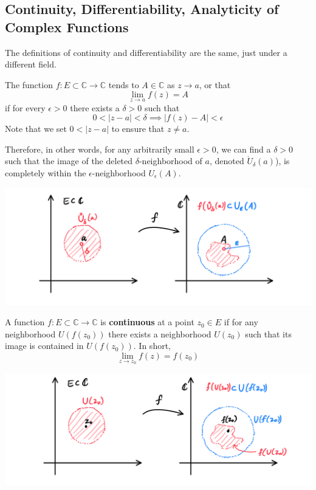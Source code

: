     \subsection{Continuity, Differentiability, Analyticity of Complex Functions}

    The definitions of continuity and differentiability are the same, just under a different field. 

    \begin{definition}
      The function $f: E \subset \mathbb{C} \longrightarrow \mathbb{C}$ tends to $A \in \mathbb{C}$ as $z \rightarrow a$, or that
      \[\lim_{z \rightarrow a} f(z) = A\]
      if for every $\epsilon > 0$ there exists a $\delta > 0$ such that
      \[0<|z - a|<\delta \implies |f(z) - A|<\epsilon\]
      Note that we set $0<|z - a|$ to ensure that $z \neq a$. 

      Therefore, in other words, for any arbitrarily small $\epsilon>0$, we can find a $\delta > 0$ such that the image of the deleted $\delta$-neighborhood of $a$, denoted $\mathring{U}_\delta (a)$), is completely within the $\epsilon$-neighborhood $U_\epsilon (A)$. 
      \begin{center}
          \includegraphics[scale=0.25]{img/Limit_of_Complex_Function.PNG}
      \end{center}
    \end{definition}

    \begin{definition}
      A function $f: E \subset \mathbb{C} \longrightarrow \mathbb{C}$ is \textbf{continuous} at a point $z_0 \in E$ if for any neighborhood $U(f(z_0))$ there exists a neighborhood $U(z_0)$ such that its image is contained in $U(f(z_0))$. In short, 
      \[\lim_{z \longrightarrow z_0} f(z) = f(z_0)\]
      \begin{center}
        \includegraphics[scale=0.25]{img/Continuity_of_Complex_Function.PNG}
      \end{center}
    \end{definition}

